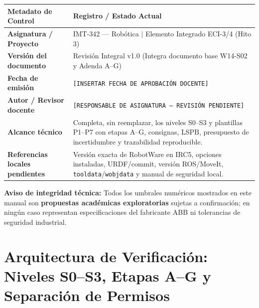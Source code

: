 \documentclass[10pt, a4paper]{article}
\begin{document}
\begin{titlepage}
    \vspace{0.8cm}
    \begin{center}
    \small
    \renewcommand{\arraystretch}{1.35}
    \begin{tabularx}{0.95\textwidth}{|>{\hsize=0.65\hsize\raggedright\arraybackslash}X|>{\hsize=1.35\hsize\raggedright\arraybackslash}X|}
    \hline
    \rowcolor{ucbblue!15}
    \textbf{Metadato de Control} & \textbf{Registro / Estado Actual} \\ \hline
    \textbf{Asignatura / Proyecto} & IMT-342 — Robótica $\mid$ Elemento Integrado ECI-3/4 (Hito 3) \\ \hline
    \textbf{Versión del documento} & Revisión Integral v1.0 (Integra documento base W14-S02 y Adenda A–G) \\ \hline
    \textbf{Fecha de emisión} & \texttt{[INSERTAR FECHA DE APROBACIÓN DOCENTE]} \\ \hline
    \textbf{Autor / Revisor docente} & \texttt{[RESPONSABLE DE ASIGNATURA — REVISIÓN PENDIENTE]} \\ \hline
    \textbf{Alcance técnico} & Completa, sin reemplazar, los niveles S0–S3 y plantillas P1–P7 con etapas A–G, consignas, LSPB, presupuesto de incertidumbre y trazabilidad reproducible. \\ \hline
    \textbf{Referencias locales pendientes} & Versión exacta de RobotWare en IRC5, opciones instaladas, URDF/commit, versión ROS/MoveIt, \texttt{tooldata}/\texttt{wobjdata} y manual de seguridad local. \\ \hline
    \end{tabularx}
    \end{center}

    \vfill
    \begin{tcolorbox}[colback=yellow!10, colframe=orange!85!black, left=2.5mm, right=2.5mm, top=1.5mm, bottom=1.5mm]
        \footnotesize\raggedright
        \textbf{Aviso de integridad técnica:} Todos los umbrales numéricos mostrados en este manual son \textbf{propuestas académicas exploratorias} sujetas a confirmación; en ningún caso representan especificaciones del fabricante ABB ni tolerancias de seguridad industrial.
    \end{tcolorbox}
\end{titlepage}

\tableofcontents
\newpage

\section{Arquitectura de Verificación: Niveles S0–S3, Etapas A–G y Separación de Permisos}
\end{document}
